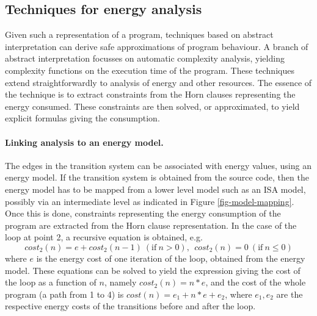 %
%
%

\subsection{Techniques for energy analysis}

Given such a representation of a program, techniques based on abstract interpretation \cite{Cousot1977}
can derive safe approximations of program behaviour. A branch of abstract interpretation 
focusses on automatic complexity analysis, yielding complexity functions on the
execution time of the program.  These techniques extend straightforwardly to analysis of energy and
other resources. The essence of the technique is to extract constraints from the Horn clauses
representing the energy consumed. These constraints are then solved, or approximated, to yield explicit 
formulas giving the consumption.


 
\paragraph{Linking analysis to an energy model.} The edges in the transition system can be 
associated with energy values, using an energy model. If the transition system is obtained
from the source code, then the energy model has to be mapped from a lower level model
such as an ISA model, possibly via an intermediate level as indicated in Figure \ref{fig-model-mapping}. 
Once this is done, constraints
representing the energy consumption of the program are extracted from the Horn clause 
representation. In the case of the loop at point 2, a recursive equation is obtained, e.g.
\[ cost_2(n) = e + cost_2(n-1)~ (\mathrm{if}~n > 0), ~~cost_2(n) = 0 ~ (\mathrm{if}~n \le 0) \]
where $e$ is the energy cost of one iteration of the loop, obtained from the energy model. These
equations can be solved to yield the expression giving the cost of the loop as a function of $n$, 
namely $cost_2(n) = n*e$, and the cost of the whole 
program (a path from 1 to 4) is $cost(n) = e_1 + n*e + e_2$, where $e_1, e_2$ are the respective
energy costs of the transitions before and after the loop.

